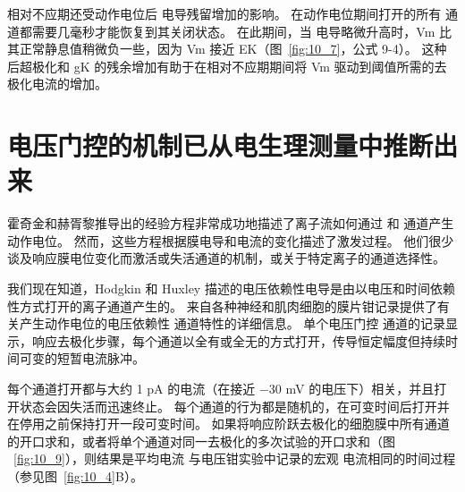 相对不应期还受动作电位后  电导残留增加的影响。 
在动作电位期间打开的所有  通道都需要几毫秒才能恢复到其关闭状态。
在此期间，当  电导略微升高时，Vm 比其正常静息值稍微负一些，因为 Vm 接近 EK（图~\ref{fig:10_7}，公式 9-4）。 
这种后超极化和 gK 的残余增加有助于在相对不应期期间将 Vm 驱动到阈值所需的去极化电流的增加。




\section{电压门控的机制已从电生理测量中推断出来}

霍奇金和赫胥黎推导出的经验方程非常成功地描述了离子流如何通过  和  通道产生动作电位。
然而，这些方程根据膜电导和电流的变化描述了激发过程。
他们很少谈及响应膜电位变化而激活或失活通道的机制，或关于特定离子的通道选择性。


我们现在知道，Hodgkin 和 Huxley 描述的电压依赖性电导是由以电压和时间依赖性方式打开的离子通道产生的。
来自各种神经和肌肉细胞的膜片钳记录提供了有关产生动作电位的电压依赖性  通道特性的详细信息。
单个电压门控  通道的记录显示，响应去极化步骤，每个通道以全有或全无的方式打开，传导恒定幅度但持续时间可变的短暂电流脉冲。


每个通道打开都与大约 1 pA 的电流（在接近 −30 mV 的电压下）相关，并且打开状态会因失活而迅速终止。 
每个通道的行为都是随机的，在可变时间后打开并在停用之前保持打开一段可变时间。
如果将响应阶跃去极化的细胞膜中所有通道的开口求和，或者将单个通道对同一去极化的多次试验的开口求和（图 ~\ref{fig:10_9}），则结果是平均电流 与电压钳实验中记录的宏观  电流相同的时间过程（参见图~\ref{fig:10_4}B）。


